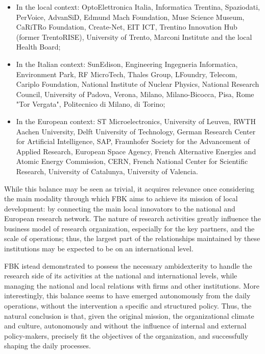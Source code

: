 \begin{itemize}

\item In the local context: OptoElettronica Italia, Informatica Trentina, Spaziodati, PerVoice, AdvanSiD, Edmund Mach Foundation, Muse Science Museum, CaRiTRo Foundation, Create-Net, EIT ICT, Trentino Innovation Hub (former TrentoRISE), University of Trento, Marconi Institute and the local Health Board;

\item In the Italian context: SunEdison, Engineering Ingegneria Informatica, Environment Park, RF MicroTech, Thales Group, LFoundry, Telecom, Cariplo Foundation, National Institute of Nuclear Physics, National Research Council, University of Padova, Verona, Milano, Milano-Bicocca, Pisa, Rome "Tor Vergata", Politecnico di Milano, di Torino;

\item In the European context: ST Microelectronics, University of Leuven, RWTH Aachen University, Delft University of Technology, German Research Center for Artificial Intelligence, SAP, Fraunhofer Society for the Advancement of Applied Research, European Space Agency, French Alternative Energies and Atomic Energy Commission,  CERN, French National Center for Scientific Research, University of Catalunya, University of Valencia.

\end{itemize}

While this balance may be seen as trivial, it acquires relevance once considering the main modality through which FBK aims to achieve its mission of local development: by connecting the main local innovators to the national and European research network. The nature of research activities greatly influence the business model of research organization, especially for the key partners, and the scale of operations; thus, the largest part of the relationships maintained by these institutions may be expected to be on an international level. 

FBK istead demonstrated to possess the necessary ambidexterity to handle the research side of its activities at the national and international levels, while managing the national and local relations with firms and other institutions. More interestingly, this balance seems to have emerged autonomously from the daily operations, without the intervention a specific and structured policy. Thus, the natural conclusion is that, given the original mission, the organizational climate and culture, autonomously and without the influence of internal and external policy-makers, precisely fit the objectives of the organization, and successfully shaping the daily processes.  

